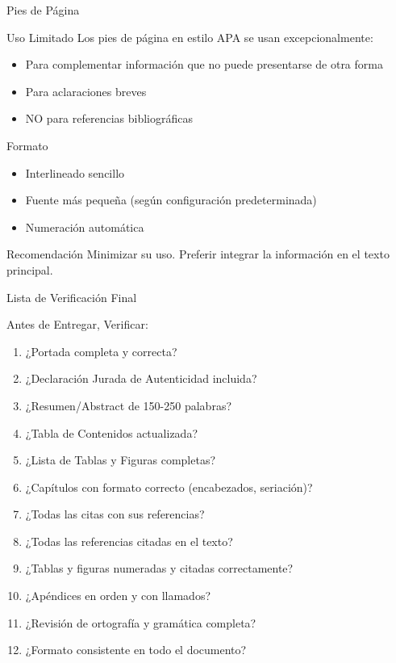 \documentclass[spanish,aspectratio=169]{beamer}
\begin{document}
\begin{frame}{Pies de Página}
	\begin{block}{Uso Limitado}
		Los pies de página en estilo APA se usan \alert{excepcionalmente}:
		\begin{itemize}
			\item Para complementar información que no puede presentarse de otra forma
			\item Para aclaraciones breves
			\item NO para referencias bibliográficas
		\end{itemize}
	\end{block}
	
	\begin{exampleblock}{Formato}
		\begin{itemize}
			\item Interlineado sencillo
			\item Fuente más pequeña (según configuración predeterminada)
			\item Numeración automática
		\end{itemize}
	\end{exampleblock}
	
	\begin{alertblock}{Recomendación}
		Minimizar su uso. Preferir integrar la información en el texto principal.
	\end{alertblock}
\end{frame}

\begin{frame}{Lista de Verificación Final}
	\begin{block}{Antes de Entregar, Verificar:}
		\small
		\begin{enumerate}
			\item ¿Portada completa y correcta?
			\item ¿Declaración Jurada de Autenticidad incluida?
			\item ¿Resumen/Abstract de 150-250 palabras?
			\item ¿Tabla de Contenidos actualizada?
			\item ¿Lista de Tablas y Figuras completas?
			\item ¿Capítulos con formato correcto (encabezados, seriación)?
			\item ¿Todas las citas con sus referencias?
			\item ¿Todas las referencias citadas en el texto?
			\item ¿Tablas y figuras numeradas y citadas correctamente?
			\item ¿Apéndices en orden y con llamados?
			\item ¿Revisión de ortografía y gramática completa?
			\item ¿Formato consistente en todo el documento?
		\end{enumerate}
	\end{block}
\end{frame}
\end{document}

